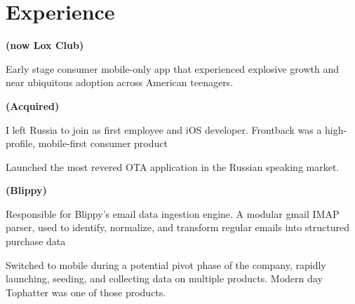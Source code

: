 \documentclass[]{plushcv}
\begin{document}







\begin{minipage}[t]{0.70\textwidth} 



\section{Experience}
\vspace{\topsep} 
\sectionsep
\sectionsep

 \textbf{(now Lox Club)}
\vspace{\topsep}
\begin{tightemize}
\sectionsep
\item Early stage consumer mobile-only app that experienced explosive growth and near ubiquitous adoption across American teenagers.
\end{tightemize}
\sectionsep

 \textbf{(Acquired)}
\begin{tightemize}
\item I left Russia to join as first employee and iOS developer. Frontback was a high-profile, mobile-first consumer product 
\end{tightemize}
\sectionsep

\begin{tightemize}
\item Launched the most revered OTA application in the Russian speaking market.

\end{tightemize}
\sectionsep

 \textbf{(Blippy)}
\begin{tightemize}
\item Responsible for Blippy’s email data ingestion engine. A modular gmail IMAP parser, used to identify, normalize, and transform regular emails into structured purchase data
\item Switched to mobile during a potential pivot phase of the company, rapidly launching, seeding, and collecting data on multiple products. Modern day Tophatter was one of those products. 
\end{tightemize}
\sectionsep


\end{minipage}
\end{document}
